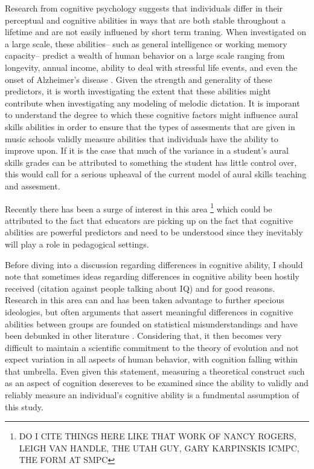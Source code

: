 \documentclass[]{book}
\let\rmarkdownfootnote\footnote%
\def\footnote{\protect\rmarkdownfootnote}
\begin{document}
Research from cognitive psychology suggests that individuals differ in their perceptual and cognitive abilities in ways that are both stable throughout a lifetime and are not easily influened by short term traning.
When investigated on a large scale, these abilities-- such as general intelligence or working memory capacity-- predict a wealth of human behavior on a large scale ranging from longevity, annual income, ability to deal with stressful life events, and even the onset of Alzheimer's disease \citep{ritchieIntelligenceAllThat2015, unsworthAutomatedVersionOperation2005}.
Given the strength and generality of these predictors, it is worth investigating the extent that these abilities might contribute when investigating any modeling of melodic dictation.
It is imporant to understand the degree to which these cognitive factors might influence aural skills abilities in order to ensure that the types of assesments that are given in music schools validly measure abilities that individuals have the ability to improve upon.
If it is the case that much of the variance in a student's aural skills grades can be attributed to something the student has little control over, this would call for a serious upheaval of the current model of aural skills teaching and assesment.

Recently there has been a surge of interest in this area \footnote{DO I CITE THINGS HERE LIKE THAT WORK OF NANCY ROGERS, LEIGH VAN HANDLE, THE UTAH GUY, GARY KARPINSKIS ICMPC, THE FORM AT SMPC} which could be attributed to the fact that educators are picking up on the fact that cognitive abilities are powerful predictors and need to be understood since they inevitably will play a role in pedagogical settings.

Before diving into a discussion regarding differences in cognitive ability, I should note that sometimes ideas regarding differences in cognitive ability been hostily received (citation against people talking about IQ) and for good reasons.
Research in this area can and has been taken advantage to further specious ideologies, but often arguments that assert meaningful differences in cognitive abilities between groups are founded on statistical misunderstandings and have been debunked in other literature \citep{gouldMismeasureMan1996}.
Considering that, it then becomes very difficult to maintain a scientific commitment to the theory of evolution \citep{darwinOriginSpecies1859} and not expect variation in all aspects of human behavior, with cognition falling within that umbrella.
Even given this statement, measuring a theoretical construct such as an aspect of cognition desereves to be examined since the ability to validly and reliably measure an individual's cognitive ability is a fundmental assumption of this study.
\end{document}
